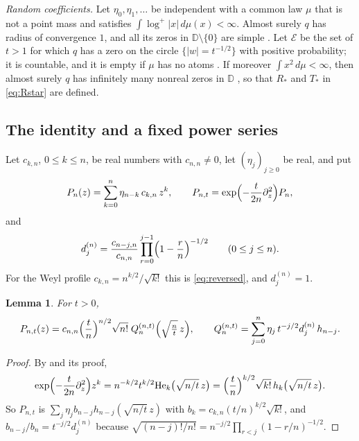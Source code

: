 \documentclass[11pt]{amsart}
\newtheorem{lemma}[theorem]{Lemma}
\theoremstyle{definition}
\theoremstyle{remark}
\numberwithin{equation}{section}
\newcommand{\D}{\mathbb{D}}
\newcommand{\He}{\mathrm{He}}
\begin{document}
\emph{Random coefficients.} Let $\eta_0,\eta_1,\dots$ be independent with a common law $\mu$ that is not a point mass and satisfies $\int\log^+|x|\,d\mu(x)<\infty$. Almost surely $q$ has radius of convergence $1$, and all its zeros in $\D\setminus\{0\}$ are simple \cite[Lemma~\ref{M-lem:resample} and the paragraph before it]{Main}. Let $\mathcal E$ be the set of $t>1$ for which $q$ has a zero on the circle $\{|w|=t^{-1/2}\}$ with positive probability; it is countable, and it is empty if $\mu$ has no atoms \cite[Lemma~\ref{M-lem:circle}]{Main}. If moreover $\int x^2\,d\mu<\infty$, then almost surely $q$ has infinitely many nonreal zeros in $\D$ \cite[Proposition~\ref{M-prop:nonreal}]{Main}, so that $R_*$ and $T_*$ in \eqref{eq:Rstar} are defined.

\subsection{The identity and a fixed power series}\label{subsec:identity}
Let $c_{k,n}$, $0\le k\le n$, be real numbers with $c_{n,n}\ne0$, let $(\eta_j)_{j\ge0}$ be real, and put
\begin{equation}\label{eq:profile-poly}
P_n(z)=\sum_{k=0}^{n}\eta_{n-k}\,c_{k,n}\,z^k,\qquad P_{n,t}=\exp\Bigl(-\frac t{2n}\partial_z^2\Bigr)P_n,
\end{equation}
and
\begin{equation}\label{eq:dnj}
d^{(n)}_j=\frac{c_{n-j,n}}{c_{n,n}}\prod_{r=0}^{j-1}\Bigl(1-\frac rn\Bigr)^{-1/2}\qquad(0\le j\le n).
\end{equation}
For the Weyl profile $c_{k,n}=n^{k/2}/\sqrt{k!}$ this is \eqref{eq:reversed}, and $d^{(n)}_j=1$.

\begin{lemma}\label{lem:profile-identity}
For $t>0$,
\begin{equation}\label{eq:profile-heat}
P_{n,t}(z)=c_{n,n}\Bigl(\frac tn\Bigr)^{n/2}\sqrt{n!}\;Q^{(n,t)}_n\Bigl(\sqrt{\tfrac nt}\,z\Bigr),\qquad Q^{(n,t)}_n=\sum_{j=0}^{n}\eta_j\,t^{-j/2}d^{(n)}_j\,h_{n-j}.
\end{equation}
\end{lemma}

\begin{proof}
By \cite[Lemma~\ref{M-lem:heat}(a)]{Main} and its proof,
\[
\exp\Bigl(-\frac t{2n}\partial_z^2\Bigr)z^k=n^{-k/2}t^{k/2}\He_k\bigl(\sqrt{n/t}\,z\bigr)=\Bigl(\frac tn\Bigr)^{k/2}\sqrt{k!}\,h_k\bigl(\sqrt{n/t}\,z\bigr).
\]
So $P_{n,t}$ is $\sum_j\eta_jb_{n-j}h_{n-j}(\sqrt{n/t}\,z)$ with $b_k=c_{k,n}(t/n)^{k/2}\sqrt{k!}$, and $b_{n-j}/b_n=t^{-j/2}d^{(n)}_j$ because $\sqrt{(n-j)!/n!}=n^{-j/2}\prod_{r<j}(1-r/n)^{-1/2}$.
\end{proof}
\end{document}

